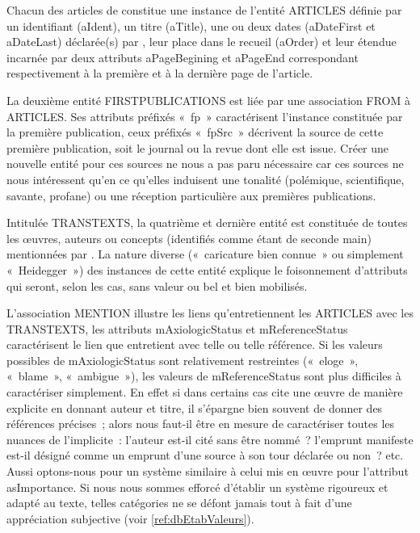 \documentclass[12pt, a4paper]{article}
\begin{document}
Chacun des articles de \punr{} constitue une instance de l'entité ARTICLES définie par un identifiant (aIdent), un titre (aTitle), une ou deux dates (aDateFirst et aDateLast) déclarée(s) par \robbe{}, leur place dans le recueil (aOrder) et leur étendue incarnée par deux attributs aPageBegining et aPageEnd correspondant respectivement à la première et à la dernière page de l'article.

La deuxième entité FIRSTPUBLICATIONS est liée par une association FROM à 
ARTICLES. Ses attributs préfixés «~fp~» caractérisent l'instance constituée par la première publication, ceux préfixés «~fpSrc~» décrivent la source de cette première publication, soit le journal ou la revue dont elle est issue. Créer une nouvelle entité pour ces sources ne nous a pas paru nécessaire car ces sources ne nous intéressent qu'en ce qu'elles induisent une tonalité (polémique, scientifique, savante, profane) ou une réception particulière aux premières publications.


Intitulée TRANSTEXTS, la quatrième et dernière entité est constituée de toutes les œuvres, auteurs ou concepts (identifiés comme étant de seconde main) mentionnées par \robbe{}. La nature diverse («~caricature bien connue~» ou simplement «~Heidegger~») des instances de cette entité explique le foisonnement d'attributs qui seront, selon les cas, sans valeur ou bel et bien mobilisés.

L'association MENTION illustre les liens qu'entretiennent les ARTICLES avec les TRANSTEXTS, les attributs mAxiologicStatus et mReferenceStatus caractérisent le lien que \punr{} entretient avec telle ou telle référence. Si les valeurs possibles de mAxiologicStatus sont relativement restreintes («~eloge~», «~blame~», «~ambigue~»), les valeurs de mReferenceStatus sont plus difficiles à caractériser simplement. En effet si dans certains cas \robbe{} cite une œuvre de manière explicite en donnant auteur et titre, il s'épargne bien souvent de donner des références précises~; alors nous faut-il être en mesure de caractériser toutes les nuances de l'implicite~: l'auteur est-il cité sans être nommé~? l'emprunt manifeste est-il désigné comme un emprunt d'une source à son tour déclarée ou non~? etc. Aussi optons-nous pour un système similaire à celui mis en œuvre pour l'attribut asImportance. Si nous nous sommes efforcé d'établir un système rigoureux et adapté au texte, telles catégories ne se défont jamais tout à fait d'une appréciation subjective (voir \ref{ref:dbEtabValeurs}).
\end{document}
